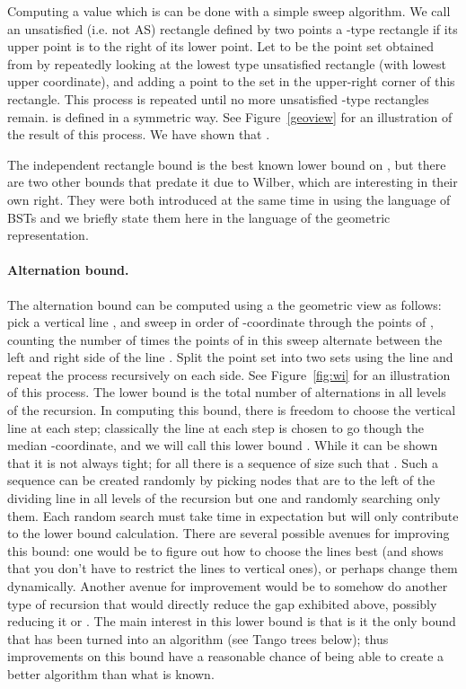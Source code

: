 \documentclass[11pt]{article}
\begin{document}
Computing a value which  is  can be done with a simple sweep algorithm. We call an unsatisfied (i.e. not AS) rectangle defined by two points a -type rectangle if its upper point is to the right of its lower point. Let  to be the point set obtained from  by repeatedly looking at the lowest   type unsatisfied rectangle (with lowest upper coordinate), and adding a point to the set in the upper-right corner of this rectangle. This process is repeated until no more unsatisfied -type rectangles remain.  is defined in a symmetric way. See Figure~\ref{geoview} for an illustration of the result of this process. We have shown that .



The independent rectangle bound is the best known lower bound on , but there are two other bounds that predate it due to Wilber, which are interesting in their own right. They were both introduced at the same time in \cite{DBLP:journals/siamcomp/Wilber89} using the language of BSTs and we briefly state them here in the language of the geometric representation.



\paragraph{Alternation bound.} The alternation bound can be computed using a the geometric view  as follows: pick a vertical line , and sweep in order of -coordinate through the points of , counting the number of times the points of  in this sweep alternate between the left and right side of the line . Split the point set  into two sets using the line and repeat the process recursively on each side. See Figure~\ref{fig:wi} for an illustration of this process. The lower bound is the total number of alternations in all levels of the recursion. In computing this bound, there is freedom to choose the vertical line at each step; classically the line at each step is chosen to go though the median -coordinate, and we will call this lower bound . While  it can be shown that it is not always tight; for all  there is a sequence  of size  such that . Such a sequence can be created randomly by picking  nodes that are to the left of the dividing line in all levels of the recursion but one and randomly searching only them. Each random search must take time  in expectation but will only contribute  to the lower bound calculation. There are several possible avenues for improving this bound: one would be to figure out how to choose the lines best (and \cite{dhthesis} shows that you don't have to restrict the lines to vertical ones), or perhaps change them dynamically. Another avenue for improvement would be to somehow do another type of recursion that would directly reduce the gap exhibited above, possibly reducing it  or . The main interest in this lower bound is that is it the only bound that has been turned into an algorithm (see Tango trees below); thus improvements on this bound have a reasonable chance of being able to create a better algorithm than what is known.
\end{document}
